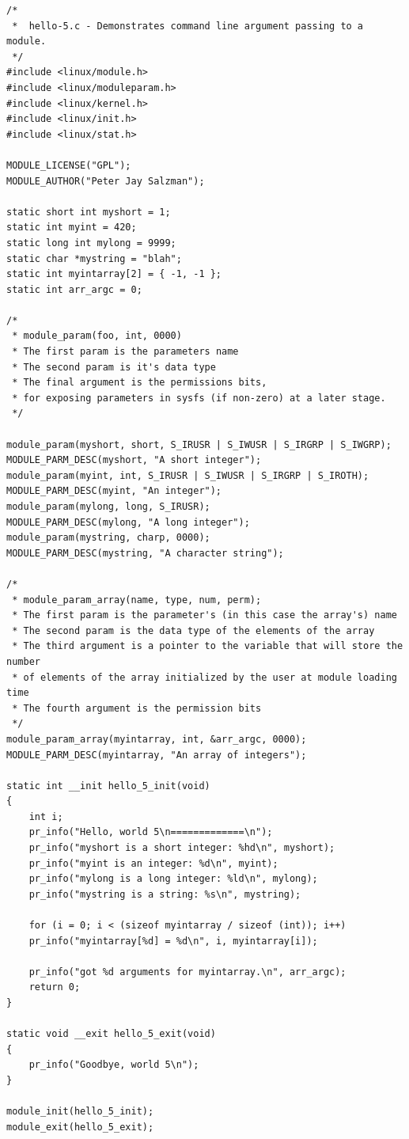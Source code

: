\documentclass[11pt]{article}
\begin{document}
\begin{verbatim}
/*
 *  hello-5.c - Demonstrates command line argument passing to a module.
 */
#include <linux/module.h>
#include <linux/moduleparam.h>
#include <linux/kernel.h>
#include <linux/init.h>
#include <linux/stat.h>

MODULE_LICENSE("GPL");
MODULE_AUTHOR("Peter Jay Salzman");

static short int myshort = 1;
static int myint = 420;
static long int mylong = 9999;
static char *mystring = "blah";
static int myintarray[2] = { -1, -1 };
static int arr_argc = 0;

/*
 * module_param(foo, int, 0000)
 * The first param is the parameters name
 * The second param is it's data type
 * The final argument is the permissions bits,
 * for exposing parameters in sysfs (if non-zero) at a later stage.
 */

module_param(myshort, short, S_IRUSR | S_IWUSR | S_IRGRP | S_IWGRP);
MODULE_PARM_DESC(myshort, "A short integer");
module_param(myint, int, S_IRUSR | S_IWUSR | S_IRGRP | S_IROTH);
MODULE_PARM_DESC(myint, "An integer");
module_param(mylong, long, S_IRUSR);
MODULE_PARM_DESC(mylong, "A long integer");
module_param(mystring, charp, 0000);
MODULE_PARM_DESC(mystring, "A character string");

/*
 * module_param_array(name, type, num, perm);
 * The first param is the parameter's (in this case the array's) name
 * The second param is the data type of the elements of the array
 * The third argument is a pointer to the variable that will store the number
 * of elements of the array initialized by the user at module loading time
 * The fourth argument is the permission bits
 */
module_param_array(myintarray, int, &arr_argc, 0000);
MODULE_PARM_DESC(myintarray, "An array of integers");

static int __init hello_5_init(void)
{
    int i;
    pr_info("Hello, world 5\n=============\n");
    pr_info("myshort is a short integer: %hd\n", myshort);
    pr_info("myint is an integer: %d\n", myint);
    pr_info("mylong is a long integer: %ld\n", mylong);
    pr_info("mystring is a string: %s\n", mystring);

    for (i = 0; i < (sizeof myintarray / sizeof (int)); i++)
	pr_info("myintarray[%d] = %d\n", i, myintarray[i]);

    pr_info("got %d arguments for myintarray.\n", arr_argc);
    return 0;
}

static void __exit hello_5_exit(void)
{
    pr_info("Goodbye, world 5\n");
}

module_init(hello_5_init);
module_exit(hello_5_exit);
\end{verbatim}
\end{document}
